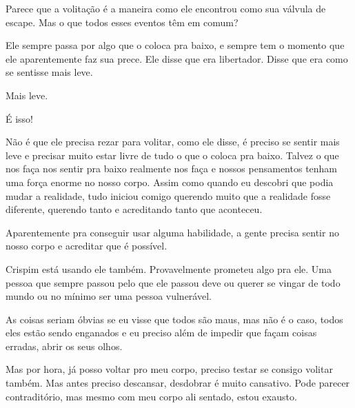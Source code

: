 Parece que a volitação é a maneira como ele encontrou como sua válvula de escape. Mas o que todos esses eventos têm em comum?

Ele sempre passa por algo que o coloca pra baixo, e sempre tem o momento que ele aparentemente faz sua prece. Ele disse que era libertador. Disse que era como se sentisse mais leve.

Mais leve.

É isso!

Não é que ele precisa rezar para volitar, como ele disse, é preciso se sentir mais leve e precisar muito estar livre de tudo o que o coloca pra baixo. Talvez o que nos faça nos sentir pra baixo realmente nos faça e nossos pensamentos tenham uma força enorme no nosso corpo. Assim como quando eu descobri que podia mudar a realidade, tudo iniciou comigo querendo muito que a realidade fosse diferente, querendo tanto e acreditando tanto que aconteceu.

Aparentemente pra conseguir usar alguma habilidade, a gente precisa sentir no nosso corpo e acreditar que é possível.

Crispim está usando ele também. Provavelmente prometeu algo pra ele. Uma pessoa que sempre passou pelo que ele passou deve ou querer se vingar de todo mundo ou no mínimo ser uma pessoa vulnerável.

As coisas seriam óbvias se eu visse que todos são maus, mas não é o caso, todos eles estão sendo enganados e eu preciso além de impedir que façam coisas erradas, abrir os seus olhos.

Mas por hora, já posso voltar pro meu corpo, preciso testar se consigo volitar também. Mas antes preciso descansar, desdobrar é muito cansativo. Pode parecer contraditório, mas mesmo com meu corpo ali sentado, estou exausto.

